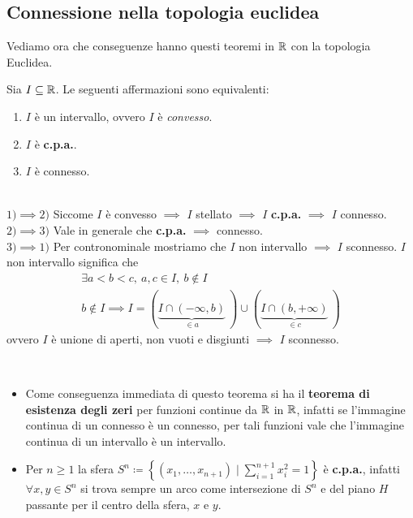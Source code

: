 \subsection{Connessione nella topologia euclidea}
Vediamo ora che conseguenze hanno questi teoremi in $\mathbb{R}$ con la topologia Euclidea.
\begin{theorema}
	Sia $I\subseteq \mathbb{R}$. Le seguenti affermazioni sono equivalenti:
		\begin{enumerate}
	\item $I$ è un intervallo, ovvero $I$ è \textit{convesso}.
	\item $I$ è \textbf{c.p.a.}.
	\item $I$ è connesso.
		\end{enumerate}
	\vspace{-3mm}
\end{theorema}
\begin{demonstration}~{}\\
	$1) \implies 2)$ Siccome $I$ è convesso $\implies$ $I$ stellato $\implies$ $I$ \textbf{c.p.a.} $\implies$ $I$ connesso. \\
	$2) \implies 3)$ Vale in generale che \textbf{c.p.a.} $\implies$ connesso.\\
	$3) \implies 1)$ Per contronominale mostriamo che $I$ non intervallo $\implies$ $I$ sconnesso. $I$ non intervallo significa che 
		\begin{gather*}
			\exists a<b<c,\ a,c\in I,\ b\notin I \\
			b\notin I \implies I= \left(\underbrace{ I\cap \left(-\infty ,b\right)}_{\in a}\ \right) \cup \left( \underbrace{I\cap \left(b ,+\infty\right)}_{\in c}\ \right)
		\end{gather*}
	ovvero $I$ è unione di aperti, non vuoti e disgiunti $\implies$ $I$ sconnesso.	
\end{demonstration}
\begin{observe}~{}\label{teorema esistenza zeri funzioni continue, s^n cpa}
		\begin{itemize}
	\item Come conseguenza immediata di questo teorema si ha il \textbf{teorema di esistenza degli zeri} per funzioni continue da $\mathbb{R}$ in $\mathbb{R}$, infatti se l'immagine continua di un connesso è un connesso, per tali funzioni vale che l'immagine continua di un intervallo è un intervallo.
	\item Per $n\geq 1$ la sfera $\displaystyle S^n \coloneqq \left\{ \left(x_1,\dots,x_{n+1}\right) \mid \sum_{i=1}^{n+1}x_i^2=1 \right\}$ è \textbf{c.p.a.}, infatti $\forall x,y\in S^n$ si trova sempre un arco come intersezione di $S^n$ e del piano $H$ passante per il centro della sfera, $x$ e $y$.
		\end{itemize}
	\vspace{-3mm}
\end{observe}
